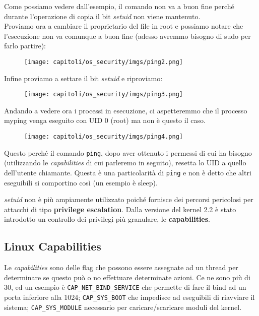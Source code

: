 Come possiamo vedere dall'esempio, il comando non va a buon fine perché durante
l'operazione di copia il bit \textit{setuid} non viene mantenuto.\\

Proviamo ora a cambiare il proprietario del file in root e possiamo notare che
l'esecuzione non va comunque a buon fine (adesso avremmo bisogno di sudo per farlo partire):

\begin{figure}[H]
    \centering
    \texttt{[image: capitoli/os\_security/imgs/ping2.png]}
\end{figure}

Infine proviamo a settare il bit \textit{setuid} e riproviamo:

\begin{figure}[H]
    \centering
    \texttt{[image: capitoli/os\_security/imgs/ping3.png]}
\end{figure}

Andando a vedere ora i processi in esecuzione, ci aspetteremmo che il processo myping
venga eseguito con UID 0 (root) ma non è questo il caso.

\begin{figure}[H]
    \centering
    \texttt{[image: capitoli/os\_security/imgs/ping4.png]}
\end{figure}

Questo perché il comando \verb|ping|, dopo aver ottenuto i permessi di cui ha
bisogno (utilizzando le \textit{capabilities} di cui parleremo in seguito), resetta
lo UID a quello dell'utente chiamante. Questa è una particolarità di \verb|ping|
e non è detto che altri eseguibili si comportino così (un esempio è sleep).

\textit{setuid} non è più ampiamente utilizzato poiché fornisce dei percorsi pericolosi
per attacchi di tipo \textbf{privilege escalation}. Dalla versione del kernel 2.2
è stato introdotto un controllo dei privilegi più granulare, le \textbf{capabilities}.

\subsection{Linux Capabilities}

Le \textit{capabilities} sono delle flag che possono essere assegnate ad un thread
per determinare se questo può o no effettuare determinate azioni. Ce ne sono più
di 30, ed un esempio è \verb|CAP_NET_BIND_SERVICE| che permette di fare il bind
ad un porta inferiore alla 1024; \verb|CAP_SYS_BOOT| che impedisce ad eseguibili
di riavviare il sistema; \verb|CAP_SYS_MODULE| necessario per caricare/scaricare
moduli del kernel.\\

